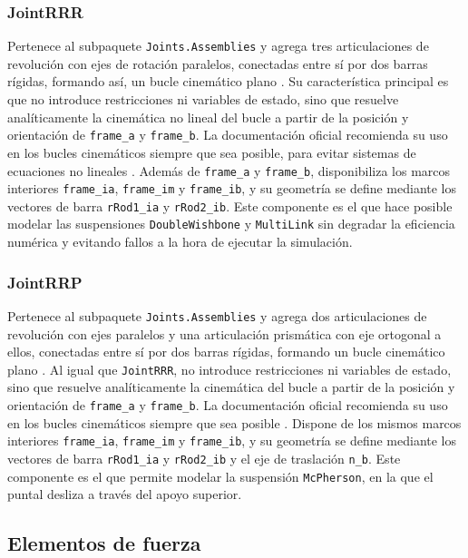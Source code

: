 \subsubsection{JointRRR} 
Pertenece al subpaquete \verb|Joints.Assemblies| y agrega tres articulaciones de revolución con ejes de rotación paralelos, conectadas entre sí por dos barras rígidas, formando así, un bucle cinemático plano \cite{msl_multibody}. Su característica principal es que no introduce restricciones ni variables de estado, sino que resuelve analíticamente la cinemática no lineal del bucle a partir de la posición y orientación de \verb|frame_a| y \verb|frame_b|. La documentación oficial recomienda su uso en los bucles cinemáticos siempre que sea posible, para evitar sistemas de ecuaciones no lineales \cite{msl_multibody}. Además de \verb|frame_a| y \verb|frame_b|, disponibiliza los marcos interiores \verb|frame_ia|, \verb|frame_im| y \verb|frame_ib|, y su geometría se define mediante los vectores de barra \verb|rRod1_ia| y \verb|rRod2_ib|. Este componente es el que hace posible modelar las suspensiones \verb|DoubleWishbone| y \verb|MultiLink| sin degradar la eficiencia numérica y evitando fallos a la hora de ejecutar la simulación.

\subsubsection{JointRRP}
Pertenece al subpaquete \verb|Joints.Assemblies| y agrega dos articulaciones de revolución con ejes paralelos y una articulación prismática con eje ortogonal a ellos, conectadas entre sí por dos barras rígidas, formando un bucle cinemático plano \cite{msl_multibody}. Al igual que \verb|JointRRR|, no introduce restricciones ni variables de estado, sino que resuelve analíticamente la cinemática del bucle a partir de la posición y orientación de \verb|frame_a| y \verb|frame_b|. La documentación oficial recomienda su uso en los bucles cinemáticos siempre que sea posible \cite{msl_multibody}. Dispone de los mismos marcos interiores \verb|frame_ia|, \verb|frame_im| y \verb|frame_ib|, y su geometría se define mediante los vectores de barra \verb|rRod1_ia| y \verb|rRod2_ib| y el eje de traslación \verb|n_b|. Este componente es el que permite modelar la suspensión \verb|McPherson|, en la que el puntal desliza a través del apoyo superior.

\subsection*{Elementos de fuerza}

